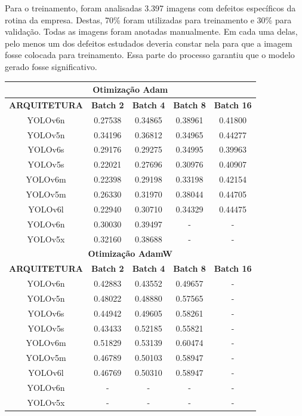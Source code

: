 Para o treinamento, foram analisadas 3.397 imagens com defeitos específicos da rotina da empresa. Destas, 70\% foram utilizadas para treinamento e 30\% para validação. Todas as imagens foram anotadas manualmente. Em cada uma delas, pelo menos um dos defeitos estudados deveria constar nela para que a imagem fosse colocada para treinamento. Essa parte do processo garantiu que o modelo gerado fosse significativo.

\begin{table}[h!]
    \centering
    \begin{tabular}{|c|c|c|c|c|}
    \hline
    \multicolumn{5}{|c|}{\textbf{Otimização Adam}} \\ \hline
    \textbf{ARQUITETURA} & \textbf{Batch 2} & \textbf{Batch 4} & \textbf{Batch 8} & \textbf{Batch 16} \\ \hline
    YOLOv6n  & 0.27538 & 0.34865 & 0.38961 & 0.41800 \\ \hline
    YOLOv5n  & 0.34196 & 0.36812 & 0.34965 & 0.44277 \\ \hline
    YOLOv6s  & 0.29176 & 0.29275 & 0.34995 & 0.39963 \\ \hline
    YOLOv5s  & 0.22021 & 0.27696 & 0.30976 & 0.40907 \\ \hline
    YOLOv6m  & 0.22398 & 0.29198 & 0.33198 & 0.42154 \\ \hline
    YOLOv5m  & 0.26330 & 0.31970 & 0.38044 & 0.44705 \\ \hline
    YOLOv6l  & 0.22940 & 0.30710 & 0.34329 & 0.44475 \\ \hline
    YOLOv6n  & 0.30030 & 0.39497 & - & - \\ \hline
    YOLOv5x  & 0.32160 & 0.38688 & - & - \\ \hline
    
    \multicolumn{5}{|c|}{\textbf{Otimização AdamW}} \\ \hline
    \textbf{ARQUITETURA} & \textbf{Batch 2} & \textbf{Batch 4} & \textbf{Batch 8} & \textbf{Batch 16} \\ \hline
    YOLOv6n  & 0.42883 & 0.43552 & 0.49657 & - \\ \hline
    YOLOv5n  & 0.48022 & 0.48880 & 0.57565 & - \\ \hline
    YOLOv6s  & 0.44942 & 0.49605 & 0.58261 & - \\ \hline
    YOLOv5s  & 0.43433 & 0.52185 & 0.55821 & - \\ \hline
    YOLOv6m  & 0.51829 & 0.53139 & 0.60474 & - \\ \hline
    YOLOv5m  & 0.46789 & 0.50103 & 0.58947 & - \\ \hline
    YOLOv6l  & 0.46769 & 0.50310 & 0.58947 & - \\ \hline
    YOLOv6n  & - & - & - & - \\ \hline
    YOLOv5x  & - & - & - & - \\ \hline
    

\end{tabular}
\end{table}
